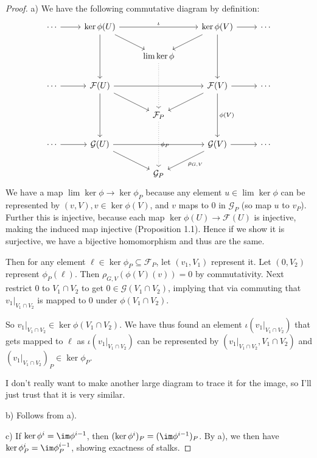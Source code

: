 \begin{proof}
	a)
	We have the following commutative diagram by definition:
	\[
		\begin{tikzcd}
			\cdots & \ker \phi(U) & & \ker \phi(V) & \cdots\\
			       & &\lim \ker \phi & &\\
			\cdots & \mathcal{F}(U) & & \mathcal{F}(V) & \cdots\\
			       & &\mathcal{F}_P & &\\
			\cdots & \mathcal{G}(U) & & \mathcal{G}(V) & \cdots\\
			       & &\mathcal{G}_P & &
			\arrow[from=1-1,to=1-2]
			\arrow["\iota ",from=1-2,to=1-4]
			\arrow[from=1-4,to=1-5]
			\arrow[from=3-1,to=3-2]
			\arrow[from=3-2,to=3-4]
			\arrow[from=3-4,to=3-5]
			\arrow[from=5-1,to=5-2]
			\arrow[from=5-2,to=5-4]
			\arrow[from=5-4,to=5-5]
			\arrow[from=1-2,to=2-3]
			\arrow[from=1-2,to=3-2]
			\arrow[from=3-2,to=5-2]
			\arrow[from=1-4,to=3-4]
			\arrow["\phi (V)",from=3-4,to=5-4]
			\arrow[from=1-4,to=2-3]
			\arrow[from=3-2,to=4-3]
			\arrow[from=3-4,to=4-3]
			\arrow[from=5-2,to=6-3]
			\arrow["\rho_{G,V}",from=5-4,to=6-3]
			\arrow[dotted,from=2-3,to=4-3]
			\arrow["\phi_P",dotted,from=4-3,to=6-3]
		\end{tikzcd}
	\] 
	We have a map $\lim\ker \phi \to \ker \phi_P $ because any element $u \in \lim \ker \phi $ can be represented by $(v,V), v\in \ker \phi(V)$, and $v $ maps to 0 in $\mathcal{G}_P $ (so map $u $ to $v_P $).
	Further this is injective, because each map $\ker \phi(U) \to \mathcal{F}(U) $ is injective, making the induced map injective (Proposition 1.1).
	Hence if we show it is surjective, we have a bijective homomorphism and thus are the same.

	Then for any element $\ell \in \ker \phi_P \subseteq \mathcal{F}_P $, let $(v_{1},V_{1}) $ represent it.
	Let $(0,V_{2}) $ represent $\phi _P(\ell) $.
	Then $\rho_{G,V}(\phi(V)(v)) = 0 $ by commutativity.
	Next restrict $0 $ to $V_{1}\cap V_{2} $ to get $0\in \mathcal{G}(V_{1}\cap V_{2}) $, implying that via commuting that $v_{1}|_{V_{1}\cap V_{2}} $ is mapped to 0 under $\phi(V_{1}\cap V_{2})$.

	So $v_{1}|_{V_{1}\cap V_{2}}\in \ker \phi(V_{1}\cap V_{2}) $.
	We have thus found an element $\iota(v_{1}|_{V_{1}\cap V_{2}}) $ that gets mapped to $\ell $ as $\iota(v_{1}|_{V_{1}\cap V_{2}}) $ can be represented by $(v_{1}|_{V_{1}\cap V_{2}},V_{1}\cap V_{2}) $ and $(v_{1}|_{V_{1}\cap V_{2}})_P \in \ker \phi_P$.

	I don't really want to make another large diagram to trace it for the image, so I'll just trust that it is very similar.

	b)
	Follows from a).

	c) If $\ker \phi^{i} = \im \phi^{i-1}$, then $(\ker \phi^i)_P = (\im \phi^{i-1})_P $.
	By a), we then have $\ker \phi^{i}_P = \im \phi^{i-1}_P $, showing exactness of stalks.
\end{proof}

